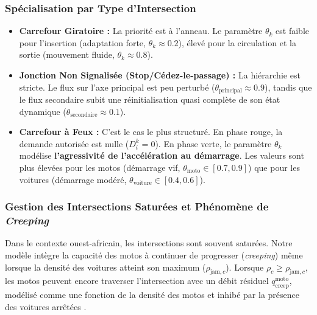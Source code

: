 \subsubsection{Spécialisation par Type d'Intersection}
\begin{itemize}
    \item \textbf{Carrefour Giratoire :} La priorité est à l'anneau. Le paramètre $\theta_k$ est faible pour l'insertion (adaptation forte, $\theta_k \approx 0.2$), élevé pour la circulation et la sortie (mouvement fluide, $\theta_k \approx 0.8$).
    \item \textbf{Jonction Non Signalisée (Stop/Cédez-le-passage) :} La hiérarchie est stricte. Le flux sur l'axe principal est peu perturbé ($\theta_{\text{principal}} \approx 0.9$), tandis que le flux secondaire subit une réinitialisation quasi complète de son état dynamique ($\theta_{\text{secondaire}} \approx 0.1$).
    \item \textbf{Carrefour à Feux :} C'est le cas le plus structuré. En phase rouge, la demande autorisée est nulle ($D_i^k = 0$). En phase verte, le paramètre $\theta_k$ modélise \textbf{l'agressivité de l'accélération au démarrage}. Les valeurs sont plus élevées pour les motos (démarrage vif, $\theta_{\text{moto}} \in [0.7, 0.9]$) que pour les voitures (démarrage modéré, $\theta_{\text{voiture}} \in [0.4, 0.6]$).
\end{itemize}

\subsubsection{Gestion des Intersections Saturées et Phénomène de \textit{Creeping}}
Dans le contexte ouest-africain, les intersections sont souvent saturées. Notre modèle intègre la capacité des motos à continuer de progresser (\textit{creeping}) même lorsque la densité des voitures atteint son maximum ($\rho_{\text{jam},c}$). Lorsque $\rho_c \geq \rho_{\text{jam},c}$, les motos peuvent encore traverser l'intersection avec un débit résiduel $q_{\text{creep}}^{\text{moto}}$, modélisé comme une fonction de la densité des motos et inhibé par la présence des voitures arrêtées \cite{FanWork2015}.


